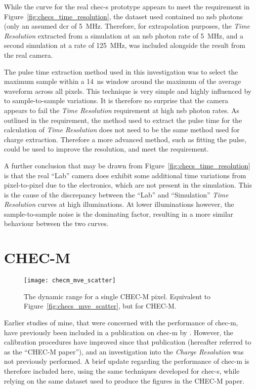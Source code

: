 While the curve for the real \gls{chec-s} prototype appears to meet the requirement in Figure~\ref{fig:checs_time_resolution}, the dataset used contained no \gls{nsb} photons (only an assumed \gls{dcr} of \SI{5}{MHz}. Therefore, for extrapolation purposes, the \textit{Time Resolution} extracted from a simulation at an \gls{nsb} photon rate of \SI{5}{MHz}, and a second simulation at a rate of \SI{125}{MHz}, was included alongside the result from the real camera.

The pulse time extraction method used in this investigation was to select the maximum sample within a \SI{14}{ns} window around the maximum of the average waveform across all pixels. This technique is very simple and highly influenced by to sample-to-sample variations. It is therefore no surprise that the camera appears to fail the \textit{Time Resolution} requirement at high \gls{nsb} photon rates. As outlined in the requirement, the method used to extract the pulse time for the calculation of \textit{Time Resolution} does not need to be the same method used for charge extraction. Therefore a more advanced method, such as fitting the pulse, could be used to improve the resolution, and meet the requirement.

A further conclusion that may be drawn from Figure~\ref{fig:checs_time_resolution} is that the real ``Lab'' camera does exhibit some additional time variations from pixel-to-pixel due to the electronics, which are not present in the simulation. This is the cause of the discrepancy between the ``Lab'' and ``Simulation'' \textit{Time Resolution} curves at high illuminations. At lower illuminations however, the sample-to-sample noise is the dominating factor, resulting in a more similar behaviour between the two curves.

\section{CHEC-M}

\begin{figure}
	\centering
    \texttt{[image: checm\_mve\_scatter]} 
	\caption[CHEC-M average measured charge versus average expected charge.]{The dynamic range for a single CHEC-M pixel. Equivalent to Figure~\ref{fig:checs_mve_scatter}, but for CHEC-M.}
	\label{fig:checm_mve_scatter}
\end{figure}

Earlier studies of mine, that were concerned with the performance of \gls{chec-m}, have previously been included in a publication on \gls{chec-m} by \textcite{Zorn2017}. However, the calibration procedures have improved since that publication (hereafter referred to as the ``CHEC-M paper''), and an investigation into the \textit{Charge Resolution} was not previously performed. A brief update regarding the performance of \gls{chec-m} is therefore included here, using the same techniques developed for \gls{chec-s}, while relying on the same dataset used to produce the figures in the CHEC-M paper.

